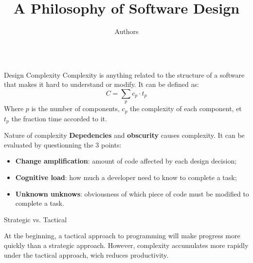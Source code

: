 \documentclass[xcolor={table}]{beamer}
\title{A Philosophy of Software Design}
\author{Authors \mainauthor{John Ousterhout}}
\begin{document}
\begin{frame}[fragile=singleslide,t]
  \centering

  \maketitle

  \begin{columns}[onlytextwidth,T]
    \begin{column}{.47\textwidth}


      \begin{block}{Design Complexity}
        Complexity is anything related to the structure of a software that makes it hard to understand or modify. It can be defined as:
        \begin{equation*}
          C = \sum_{p} c_{p} \cdot t_{p}
        \end{equation*}
        Where $p$ is the number of components, $c_p$ the complexity of each component, et $t_p$ the fraction time accorded to it.
      \end{block}

      
      \begin{block}{Nature of complexity}
        \textbf{Depedencies} and \textbf{obscurity} causes complexity. It can be evaluated by questionning the 3 points:
        \begin{itemize}
        \item \textbf{Change amplification}: amount of code affected by each design decision;
        \item \textbf{Cognitive load}: how much a developer need to know to complete a task;
        \item \textbf{Unknown unknows}: obviousness of which piece of code must be modified to complete a task.
        \end{itemize}
      \end{block}
      

      \begin{block}{Strategic vs. Tactical}
        \begin{sidefigure}
          \centering \scalebox{0.7}{}
          \caption {Tactical programming make things work, quickly. Strategic programming invest time on design.}
        \end{sidefigure}
        At the beginning, a tactical approach to programming will make progress more quickly than a strategic approach. However, complexity accumulates more rapidly under the tactical approach, wich reduces productivity.
      \end{block}



\end{column}
\end{columns}
\end{frame}
\end{document}
